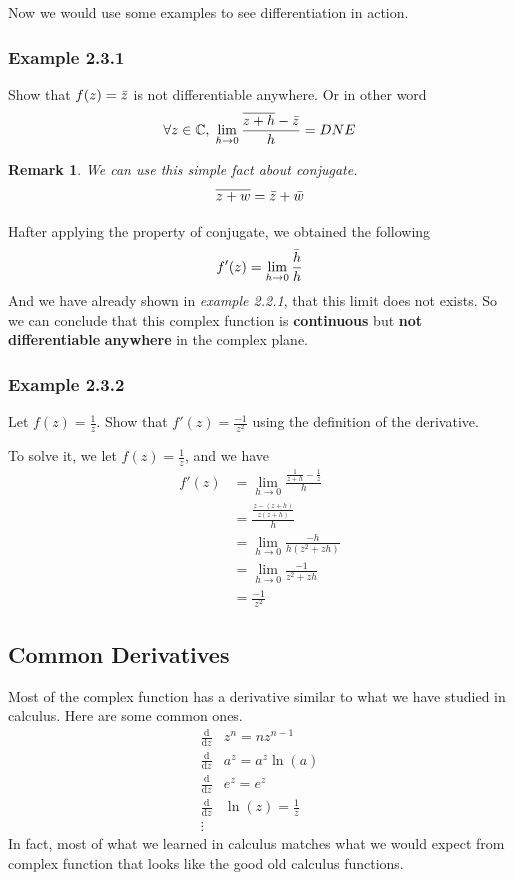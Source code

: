 \documentclass[12pt]{book}
\newcommand{\limto}[1]{\lim_{#1}}
\newcommand{\C}{\mathbb{C}}
\newcommand{\dydx}[2]{\frac{\text{d} #1}{\text{d} #2}}
\newcommand{\paren}[1]{\left( #1 \right)}
\newtheorem*{remark}{Remark}
\begin{document}
Now we would use some examples to see differentiation in action.
\subsubsection{Example 2.3.1}
Show that $f(z) = \Bar{z}$ is not differentiable anywhere. Or in other word
\[
\forall z \in \C, \; \limto{h \to 0}\frac{\overline{z+h}-\Bar{z}}{h} = DNE
\]
\begin{remark}
We can use this simple fact about conjugate.
    \begin{align}
        \overline{z+w} = \Bar{z}+ \Bar{w}
    \end{align}
\end{remark}
Hafter applying the property of conjugate, we obtained the following
\[
f'(z) = \limto{h \to 0}\frac{\Bar{h}}{h}
\]
And we have already shown in \textit{example 2.2.1}, that this limit does not exists. So we can conclude that this complex function is \textbf{continuous} but \textbf{not differentiable} \textbf{anywhere} in the complex plane. 

\subsubsection{Example 2.3.2}
Let $f(z) = \frac{1}{z}$.  Show that $f'(z) = \frac{-1}{z^{2}}$ using the definition of the derivative.  

To solve it, we let $f(z)=\frac{1}{z}$, and we have
\begin{align*}
    f'(z)   &=\lim_{h\to 0}\frac{\frac{1}{z+h}-\frac{1}{z}}{h}\\
            &=\frac{\frac{z-(z+h)}{z(z+h)}}{h}\\
            &=\lim_{h\to 0}\frac{-h}{h(z^2+zh)}\\
            &=\lim_{h\to 0}\frac{-1}{z^2+zh}\\
            &=\frac{-1}{z^2}
\end{align*}
\subsection{Common Derivatives}
Most of the complex function has a derivative similar to what we have studied in calculus. Here are some common ones.
\begin{align*}
    \dydx{}{z} &z^n = nz^{n-1}\\
    \dydx{}{z} &a^z = a^z\ln\paren{a}\\
    \dydx{}{z} &e^z = e^z\\
    \dydx{}{z} &\ln\paren{z} = \frac{1}{z}\\
    \vdots
\end{align*}
In fact, most of what we learned in calculus matches what we would expect from complex function that looks like the good old calculus functions. 
\end{document}

